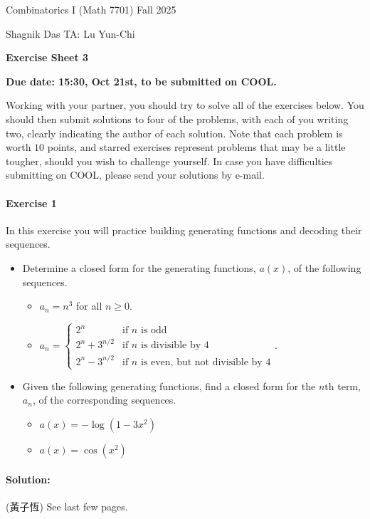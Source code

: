 \documentclass[a4paper,12pt]{article}
\newcommand{\courseTitle}{Combinatorics I (Math 7701)}
\newcommand{\semester}{Fall 2025}
\newcommand{\instructorA}{Shagnik Das}
\newcommand{\instructorB}{TA: Lu Yun-Chi}
\newcommand{\sheetNumber}{3}
\newcommand{\dueDate}{15:30, Oct 21st, to be submitted on COOL.}
\newcommand{\buildtitle}[4]{
\begin{flushleft}
{\large
#1
\hfill{}
#2
\par
#3
}
\end{flushleft}
\vskip 4pt
\begin{center}
{\large\bfseries#4\par}
\end{center}
\bigskip
}
\begin{document}
\buildtitle{\courseTitle{}}{\semester}{\instructorA{} \hfill \instructorB{}}{Exercise Sheet \sheetNumber{}}

\vspace{-0.2in}

\begin{center}
{\bf Due date: \dueDate{}}

\end{center}

\noindent Working with your partner, you should try to solve all of the exercises below. You should then submit solutions to four of the problems, with each of you writing two, clearly indicating the author of each solution. Note that each problem is worth $10$ points, and starred exercises represent problems that may be a little tougher, should you wish to challenge yourself. In case you have difficulties submitting on COOL, please send your solutions by e-mail.

\paragraph{Exercise 1}  In this exercise you will practice building generating functions and decoding their sequences.
\begin{itemize}
	\item[(a)] Determine a closed form for the generating functions, $a(x)$, of the following sequences.
\begin{itemize}
	\item[(i)] $a_n = n^3$ for all $n \ge 0$.
	\item[(ii)] $a_n = \begin{cases}
	2^n &\mbox{if } n \mbox{ is odd} \\
	2^n + 3^{n/2} &\mbox{if } n \mbox{ is divisible by } 4 \\
	2^n - 3^{n/2} & \mbox{if } n \mbox{ is even, but not divisible by } 4
	\end{cases}$.
\end{itemize}
	\item[(b)] Given the following generating functions, find a closed form for the $n$th term, $a_n$, of the corresponding sequences.
\begin{itemize}
	\item[(I)] $a(x) = - \log (1 - 3x^2)$
	\item[(II)] $a(x) = \cos (x^2)$
\end{itemize}
\end{itemize}
\paragraph{Solution:} (黃子恆) See last few pages.
\end{document}
